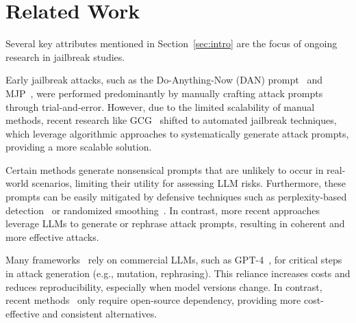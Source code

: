 





\section{Related Work}


Several key attributes mentioned in  Section~\ref{sec:intro} are the focus of ongoing research in jailbreak studies.

 Early jailbreak attacks, such as the Do-Anything-Now (DAN) prompt~\citep{walkerspider_dan_2022, shen_anything_2024} and MJP~\citep{li_multi-step_2023},  were performed predominantly by manually crafting attack prompts through trial-and-error. However, due to the limited scalability of manual methods, recent research like GCG~\citep{zou_universal_2023} shifted to automated jailbreak techniques, which leverage algorithmic approaches to systematically generate attack prompts, providing a more scalable solution.
    

    
 Certain methods \citep{zou_universal_2023} generate nonsensical prompts that are unlikely to occur in real-world scenarios, limiting their utility for assessing LLM risks. Furthermore, these prompts can be easily mitigated by defensive techniques such as perplexity-based detection~\citep{alon_detecting_2023} or randomized smoothing~\citep{robey_smoothllm_2024}. In contrast, more recent approaches~\citep{chao_jailbreaking_2024, liu_autodan_2024} leverage LLMs to generate or rephrase attack prompts, resulting in coherent and more effective attacks.


    
 Many frameworks~\citep{yu_gptfuzzer_2024} rely on commercial LLMs, such as GPT-4~\citep{openai_gpt-4_2024}, for critical steps in attack generation (e.g., mutation, rephrasing). This reliance increases costs and reduces reproducibility, especially when model versions change. In contrast, recent methods~\citep{chao_jailbreaking_2024} only require open-source dependency, providing more cost-effective and consistent alternatives.

